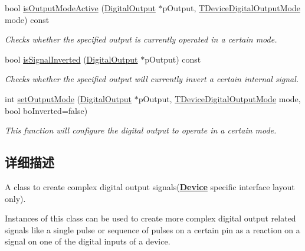 \begin{DoxyCompactItemize}
bool \hyperlink{classmv_i_m_p_a_c_t_1_1acquire_1_1_output_signal_generator_blue_device_a7d9cf2368f1cf9a3cb80c605031cb297}{is\+Output\+Mode\+Active} (\hyperlink{classmv_i_m_p_a_c_t_1_1acquire_1_1_digital_output}{Digital\+Output} $\ast$p\+Output, \hyperlink{group___device_specific_interface_gad65061e17a93ca4a79e5b75d8ca78a27}{T\+Device\+Digital\+Output\+Mode} mode) const 
\begin{DoxyCompactList}\small\item\em Checks whether the specified output is currently operated in a certain mode. \end{DoxyCompactList}\item 
bool \hyperlink{classmv_i_m_p_a_c_t_1_1acquire_1_1_output_signal_generator_blue_device_aac4ecc22150878bd9ba1abc9da6b303f}{is\+Signal\+Inverted} (\hyperlink{classmv_i_m_p_a_c_t_1_1acquire_1_1_digital_output}{Digital\+Output} $\ast$p\+Output) const 
\begin{DoxyCompactList}\small\item\em Checks whether the specified output will currently invert a certain internal signal. \end{DoxyCompactList}\item 
int \hyperlink{classmv_i_m_p_a_c_t_1_1acquire_1_1_output_signal_generator_blue_device_a2f29165006a964ee40f58609c39f2c7c}{set\+Output\+Mode} (\hyperlink{classmv_i_m_p_a_c_t_1_1acquire_1_1_digital_output}{Digital\+Output} $\ast$p\+Output, \hyperlink{group___device_specific_interface_gad65061e17a93ca4a79e5b75d8ca78a27}{T\+Device\+Digital\+Output\+Mode} mode, bool bo\+Inverted=false)
\begin{DoxyCompactList}\small\item\em This function will configure the digital output to operate in a certain mode. \end{DoxyCompactList}\end{DoxyCompactItemize}


\subsection{详细描述}
A class to create complex digital output signals({\bfseries \hyperlink{classmv_i_m_p_a_c_t_1_1acquire_1_1_device}{Device}} specific interface layout only). 

Instances of this class can be used to create more complex digital output related signals like a single pulse or sequence of pulses on a certain pin as a reaction on a signal on one of the digital inputs of a device.

